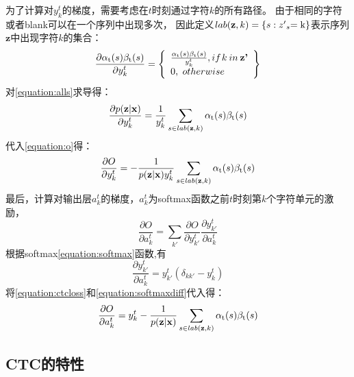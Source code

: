 为了计算对$y_k^t$的梯度，需要考虑在$t$时刻通过字符$k$的所有路径。
由于相同的字符或者blank可以在一个序列中出现多次，
因此定义$lab({\textbf{z}},k) = \{ s:{{z'}_s}{\rm{ = k\} }}$表示序列$\textbf{z}$中出现字符$k$的集合：
\begin{equation}
\frac{{\partial {\alpha _{\rm{t}}}(s){\beta _{\rm{t}}}(s)}}{{\partial y_k^t}} = \left\{ \begin{array}{l}
\frac{{{\alpha _{\rm{t}}}(s){\beta _{\rm{t}}}(s)}}{{y_k^t}},if{\kern 1pt} k{\kern 1pt} {\kern 1pt} in{\kern 1pt} {\kern 1pt} {\textbf{z'}}\\
0,{\kern 1pt} {\kern 1pt} {\kern 1pt} otherwise
\end{array} \right\}
\end{equation}
对\ref{equation:alls}求导得：
\begin{equation}
\frac{{\partial p({\textbf{z}}|{\textbf{x}})}}{{\partial y_k^t}} = \frac{1}{{y_k^t}}\sum\limits_{s \in lab({\textbf{z}},k)}^{} {{\alpha _{\rm{t}}}(s){\beta _{\rm{t}}}(s)}
\end{equation}
代入\ref{equation:o}得：
\begin{equation}
\label{equation:ctcloss}
\frac{{\partial O}}{{\partial y_k^t}} =  - \frac{1}{{p({\textbf{z}}|{\textbf{x}})y_k^t}}\sum\limits_{s \in lab({\textbf{z}},k)}^{} {{\alpha _{\rm{t}}}(s){\beta _{\rm{t}}}(s)}
\end{equation}
最后，计算对输出层$a_k^t$的梯度，$a_k^t$为softmax函数之前$t$时刻第$k$个字符单元的激励，
\begin{equation}
\label{equation:alldiff}
\frac{{\partial O}}{{\partial a_k^t}} = \sum\limits_{k'} {\frac{{\partial O}}{{\partial y_{k'}^t}}} \frac{{\partial y_{k'}^t}}{{\partial a_k^t}}
\end{equation}
根据softmax\ref{equation:softmax}函数,有
\begin{equation}
\label{equation:softmaxdiff}
\frac{{\partial y_{k'}^t}}{{\partial a_k^t}} = y_{k'}^t({\delta _{kk'}} - y_k^t)
\end{equation}
将\ref{equation:ctcloss}和\ref{equation:softmaxdiff}代入\label{equation:alldiff}得：
\begin{equation}
\frac{{\partial O}}{{\partial a_k^t}} = y_k^t - \frac{1}{{p({\textbf{z}}|{\textbf{x}})}}\sum\limits_{s \in lab({\textbf{z}},k)}^{} {{\alpha _{\rm{t}}}(s){\beta _{\rm{t}}}(s)}
\end{equation}

\subsection{CTC的特性}

